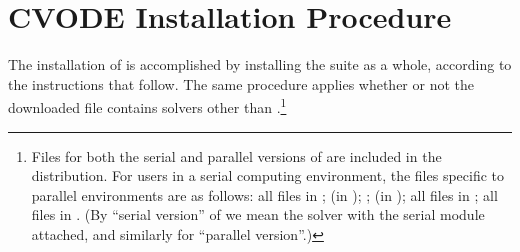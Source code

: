 \chapter{CVODE Installation Procedure}\label{s:install}

The installation of {\cvode} is accomplished by installing the
{\sundials} suite as a whole, according to the instructions that
follow.   The same procedure applies whether or not the downloaded
file contains solvers other than {\cvode}.\footnote{Files for both the
serial and parallel versions of {\cvode} are included in the distribution.
For users in a serial computing environment, the files specific to parallel
environments are as follows:
all files in ;
 (in );
; 
 (in );
all files in ;
all files in .
(By ``serial version'' of {\cvode} we mean the {\cvode} solver with the
serial {\nvector} module attached, and similarly for ``parallel version''.)}




